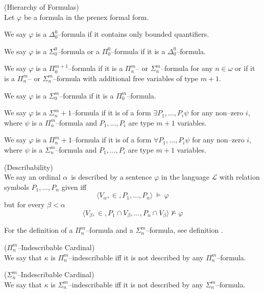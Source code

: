 \begin{definition}{(Hierarchy of Formulas)}\label{def:analytical_hierarchy}\\
Let $\varphi$ be a formula in the prenex formal form.
\bce[(i)]
\item We say $\varphi$ is a $\Delta^0_0$–formula if it contains only bounded quantifiers.
\item We say $\varphi$ is a $\Sigma^0_0$–formula or a $\Pi^0_0$–formula if it is a $\Delta^0_0$–formula.
\item We say $\varphi$ is a $\Pi^{m+1}_0$–formula if it is a $\Pi^m_n$– or $\Sigma^m_n$–formula for any $n \in \omega$ or if it is a $\Pi^m_n$– or $\Sigma^m_n$–formula with additional free variables of type $m+1$.
\item We say $\varphi$ is a $\Sigma^m_0$–formula if it is a $\Pi^m_0$–formula.
\item We say $\varphi$ is a $\Sigma^m_n+1$–formula if it is of a form $\exists P_1, \ldots, P_i \psi$ for any non–zero $i$, where $\psi$ is a $\Pi^m_n$–formula and $P_1, \ldots, P_i$ are type $m+1$ variables.
\item We say $\varphi$ is a $\Pi^m_n+1$–formula if it is of a form $\forall P_1, \ldots, P_i \psi$ for any non–zero $i$, where $\psi$ is a $\Sigma^m_n$–formula and $P_1, \ldots, P_i$ are type $m+1$ variables.
\ece
\end{definition}


\begin{definition}{(Describability)}\label{def:describability}\\
We say an ordinal $\alpha$ is described by a sentence $\varphi$ in the language $\mathscr{L}$ with relation symbols $P_1, \ldots, P_n$ given iff
\begin{equation}
\langle V_\alpha, \in, P_1, \ldots, P_n \rangle~\models~\varphi
\end{equation}
but for every $\beta < \alpha$
\begin{equation}
\langle V_\beta, \in, P_1 \cap V_\beta, \ldots, P_n \cap V_\beta \rangle \not\models \varphi
\end{equation}
\end{definition}

For the definition of a $\Pi^m_n$–formula and a $\Sigma^m_n$–formula, see definition .

\begin{definition}{($\Pi^m_n$–Indescribable Cardinal)}\label{def:pi_mn_indescribable}\\
We say that $\kappa$ is $\Pi^m_n$–indescribable iff it is not described by any $\Pi^m_n$–formula.
\end{definition}
\begin{definition}{($\Sigma^m_n$–Indescribable Cardinal)}\label{def:sigma_mn_indescribable}\\
We say that $\kappa$ is $\Sigma^m_n$–indescribable iff it is not described by any $\Sigma^m_n$–formula.
\end{definition}

